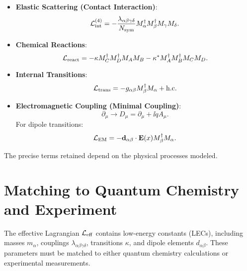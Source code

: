 \begin{itemize}
	\item \textbf{Elastic Scattering (Contact Interaction)}:
	\begin{equation}
		\mathcal{L}_{\text{int}}^{(4)} = -\frac{\lambda_{\alpha\beta\gamma\delta}}{N_{\text{sym}}} M^\dagger_\alpha M^\dagger_\beta M_\gamma M_\delta.
	\end{equation}
	
	\item \textbf{Chemical Reactions}:
	\begin{equation}
		\mathcal{L}_{\text{react}} = -\kappa M^\dagger_C M^\dagger_D M_A M_B - \kappa^* M^\dagger_A M^\dagger_B M_C M_D.
	\end{equation}
	
	\item \textbf{Internal Transitions}:
	\begin{equation}
		\mathcal{L}_{\text{trans}} = -g_{\alpha\beta} M^\dagger_\beta M_\alpha + \text{h.c.}
	\end{equation}
	
	\item \textbf{Electromagnetic Coupling (Minimal Coupling)}:
	\[
	\partial_\mu \rightarrow D_\mu = \partial_\mu + \ii q A_\mu.
	\]
	For dipole transitions:
	\begin{equation}
		\mathcal{L}_{\text{EM}} = -\vb{d}_{\alpha\beta} \cdot \vb{E}(x) M^\dagger_\beta M_\alpha.
	\end{equation}
\end{itemize}

The precise terms retained depend on the physical processes modeled.

\section{Matching to Quantum Chemistry and Experiment}
\label{sec:matching_to_qc}

The effective Lagrangian \( \mathcal{L}_{\mathrm{eff}} \) contains low-energy constants (LECs), including masses \( m_\alpha \), couplings \( \lambda_{\alpha\beta\gamma\delta} \), transitions \( \kappa \), and dipole elements \( d_{\alpha\beta} \). These parameters must be matched to either quantum chemistry calculations or experimental measurements.

